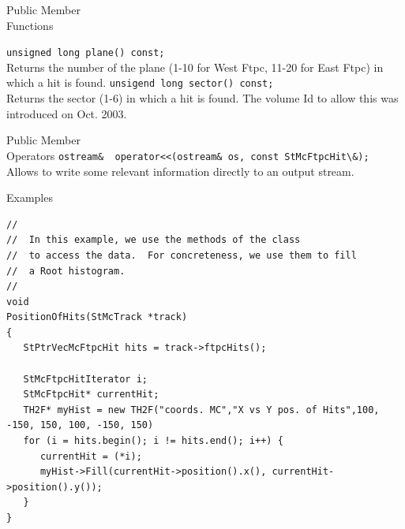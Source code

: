 \begin{Entry}
\item[Public Member\\ Functions]

    \verb+unsigned long plane() const;+\\
    Returns the number of the plane (1-10 for West Ftpc, 11-20 for East Ftpc) in which a hit is found. 
    \verb+unsigend long sector() const;+\\
    Returns the sector (1-6) in which a hit is found.  The volume Id to allow this was introduced on Oct. 2003.

\item[Public Member\\ Operators]
    \verb+ostream&  operator<<(ostream& os, const StMcFtpcHit\&);+\\
    Allows to write some relevant information directly to an output
    stream.

\item[Examples]
{\footnotesize
\begin{verbatim}
//
//  In this example, we use the methods of the class
//  to access the data.  For concreteness, we use them to fill
//  a Root histogram. 
//  
void
PositionOfHits(StMcTrack *track)
{
   StPtrVecMcFtpcHit hits = track->ftpcHits();

   StMcFtpcHitIterator i;
   StMcFtpcHit* currentHit;
   TH2F* myHist = new TH2F("coords. MC","X vs Y pos. of Hits",100, -150, 150, 100, -150, 150)
   for (i = hits.begin(); i != hits.end(); i++) {
      currentHit = (*i);
      myHist->Fill(currentHit->position().x(), currentHit->position().y());
   }
}
\end{verbatim}
}%
\end{Entry}

\clearpage
%
%
